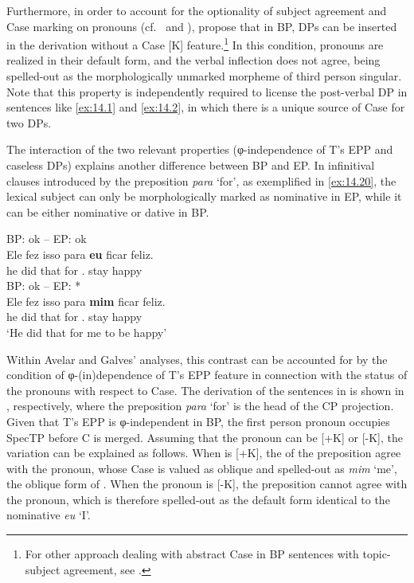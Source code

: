 \documentclass[output=paper]{langsci/langscibook}
\begin{document}
Furthermore, in order to account for the optionality of subject agreement and
Case marking on pronouns (cf.\  and ),
\textcite{AvelarGalves2011,AvelarGalves2016} propose that in BP, DPs can be inserted in the
derivation without a Case [K] feature.\footnote{For other approach dealing with
abstract Case in \gls{BP} sentences with topic-subject agreement, see
\citet{Nunes2017}.} In this condition, pronouns are realized in their default
form, and the verbal inflection does not agree, being spelled-out as the
morphologically unmarked morpheme of third person singular. Note that this
property is independently required to license the post-verbal DP in sentences
like \eqref{ex:14.1} and \eqref{ex:14.2}, in which there is a unique
source of Case for two DPs.

The interaction of the two relevant properties (φ-independence of T’s
\gls{EPP}
and caseless DPs) explains another difference between \gls{BP} and EP. In
infinitival clauses introduced by the preposition \emph{para} ‘for’, as
exemplified in \eqref{ex:14.20}, the lexical subject can only be
morphologically marked as nominative in EP, while it can be either nominative
or dative in BP.

\ea\label{ex:14.20}
    \ea     \gls{BP}: ok -- \gls{EP}: ok\\
    \gll    Ele fez isso para \textbf{eu} ficar feliz.\\
            he did that for \Fsg.\Nom{} stay happy\\
    \ex     \gls{BP}: ok -- \gls{EP}: *\\
    \gll    Ele fez isso para \textbf{mim} ficar feliz.\\
            he did that for \Fsg.\Dat{} stay happy\\
    \glt    ‘He did that for me to be happy’
    \z
\z

Within Avelar and Galves’ analyses, this contrast can be accounted for by
the condition of φ-(in)dependence of T’s \gls{EPP} feature in connection with
the status of the pronouns with respect to Case. The derivation of the
sentences in  is shown in , respectively, where the preposition
\emph{para} ‘for’ is the head of the CP projection. Given that T’s \gls{EPP} is
φ-independent in BP, the first person pronoun occupies SpecTP before C is
merged. Assuming that the pronoun can be [+K] or [-K], the variation can be
explained as follows. When \Fsg{} is [+K], the  of the preposition agree
with the pronoun, whose Case is valued as oblique and spelled-out as \emph{mim}
‘me’, the oblique form of \Fsg. When the pronoun is [-K], the preposition
cannot agree with the pronoun, which is therefore spelled-out as the default
form identical to the nominative \emph{eu} ‘I’.
\end{document}

